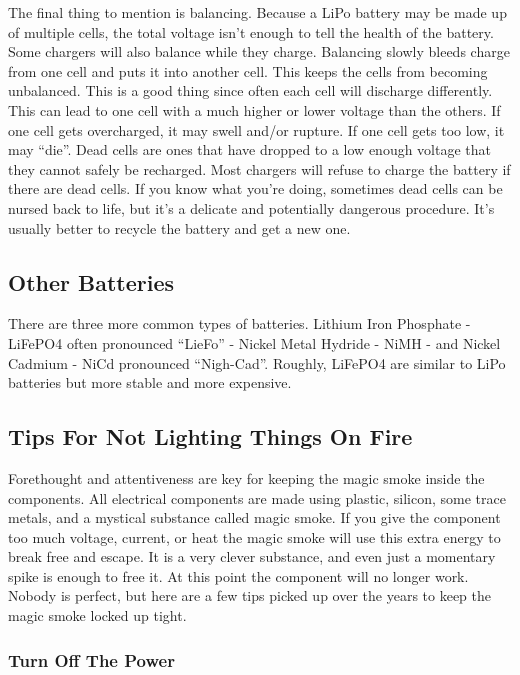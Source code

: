 The final thing to mention is balancing. Because a LiPo battery may be
made up of multiple cells, the total voltage isn't enough to tell the
health of the battery. Some chargers will also balance while they
charge. Balancing slowly bleeds charge from one cell and puts it into
another cell. This keeps the cells from becoming unbalanced. This is a
good thing since often each cell will discharge differently. This can
lead to one cell with a much higher or lower voltage than the others. If
one cell gets overcharged, it may swell and/or rupture. If one cell gets
too low, it may ``die''. Dead cells are ones that have dropped to a low
enough voltage that they cannot safely be recharged. Most chargers will
refuse to charge the battery if there are dead cells. If you know what
you're doing, sometimes dead cells can be nursed back to life, but it's
a delicate and potentially dangerous procedure. It's usually better to
recycle the battery and get a new one.

\hypertarget{other-batteries}{%
\subsection{Other Batteries}\label{other-batteries}}

There are three more common types of batteries. Lithium Iron Phosphate
-LiFePO4 often pronounced ``LieFo'' - Nickel Metal Hydride - NiMH - and
Nickel Cadmium - NiCd pronounced ``Nigh-Cad''. Roughly, LiFePO4 are
similar to LiPo batteries but more stable and more expensive.

\hypertarget{tips-for-not-lighting-things-on-fire}{%
\subsection{Tips For Not Lighting Things On
Fire}\label{tips-for-not-lighting-things-on-fire}}

Forethought and attentiveness are key for keeping the magic smoke inside
the components. All electrical components are made using plastic,
silicon, some trace metals, and a mystical substance called magic smoke.
If you give the component too much voltage, current, or heat the magic
smoke will use this extra energy to break free and escape. It is a very
clever substance, and even just a momentary spike is enough to free it.
At this point the component will no longer work. Nobody is perfect, but
here are a few tips picked up over the years to keep the magic smoke
locked up tight.

\hypertarget{turn-off-the-power}{%
\subsubsection{Turn Off The Power}\label{turn-off-the-power}}

